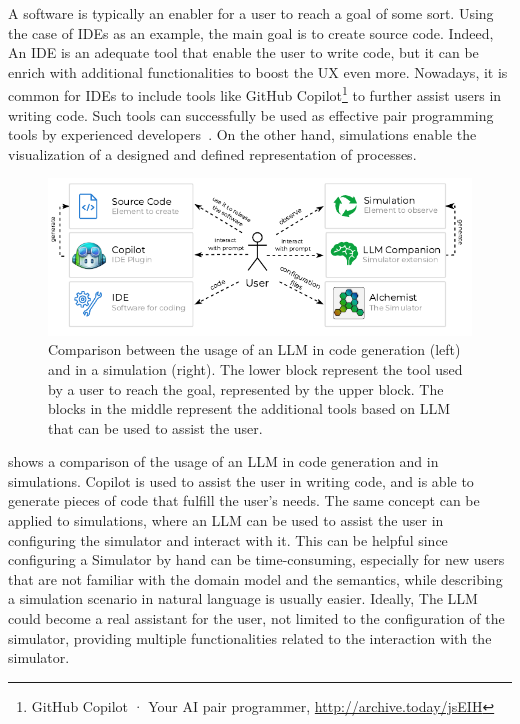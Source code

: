 \documentclass[conference]{IEEEtran}
\begin{document}
A software is typically an enabler for a user to reach a goal of some sort.
%
Using the case of \acp{IDE} as an example,
the main goal is to create source code.
%
Indeed,
An IDE is an adequate tool that enable the user to write code,
but it can be enrich with additional functionalities to boost the \ac{UX} even more.
%
Nowadays,
it is common for \acp{IDE} to include tools like GitHub Copilot\footnote{
    GitHub Copilot · Your AI pair programmer, \url{http://archive.today/jsEIH}
} to further assist users in writing code.
%
Such tools can successfully be used as effective pair programming tools by experienced developers~\cite{DBLP:journals/jss/DakhelMNKDJ23}.
%
On the other hand,
simulations enable the visualization of a designed and defined representation of processes.
%
\begin{figure}
    \includegraphics[width=\columnwidth]{use-case}
    \caption{
        Comparison between the usage of an LLM in code generation (left) and in a simulation (right).
        The lower block represent the tool used by a user to reach the goal, represented by the upper block.
        The blocks in the middle represent the additional tools based on LLM that can be used to assist the user.
    }
    \label{fig:usecase}
\end{figure}
%
 shows a comparison of the usage of an \ac{LLM} in code generation and in simulations.
%
Copilot is used to assist the user in writing code,
and is able to generate pieces of code that fulfill the user's needs.
%
The same concept can be applied to simulations,
where an \ac{LLM} can be used to assist the user in configuring the simulator and interact with it.
%
This can be helpful since configuring a Simulator by hand can be time-consuming,
especially for new users that are not familiar with the domain model and the semantics,
while describing a simulation scenario in natural language is usually easier.
%
Ideally,
The \ac{LLM} could become a real assistant for the user,
not limited to the configuration of the simulator,
providing multiple functionalities related to the interaction with the simulator.
%
\end{document}
